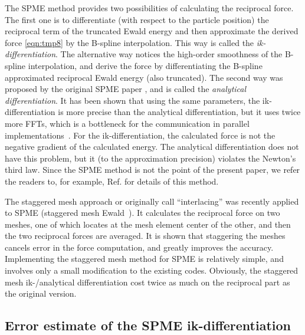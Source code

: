 \documentclass[journal=jacsat,manuscript=article]{achemso}
\newcommand{\redc}[1]{{\color{black} #1}}
\begin{document}
The SPME method provides two possibilities of calculating the
reciprocal force. The first one is to differentiate (with respect to
the particle position) the reciprocal term of the truncated Ewald
energy and then approximate the derived force \ref{eqn:tmp8} by the
B-spline interpolation. This way is called the
\emph{ik-differentiation}.
The alternative way notices the high-order
smoothness of the B-spline interpolation, and derive the force by
differentiating the B-spline approximated reciprocal Ewald energy
(also truncated). The second way was proposed by the original SPME paper
\cite{essmann1995spm}, and is called the \emph{analytical
  differentiation}.
It has been shown that using the same parameters,
the ik-differentiation is more precise than the analytical
differentiation, but it uses twice more FFTs, which is a bottleneck
for the communication in parallel
implementations~\cite{wang2010optimizing}.
For the ik-differentiation, the calculated force is not the negative
gradient of the calculated energy. The analytical differentiation
does not have this problem, but it (to the approximation precision)
violates the Newton's third law.
Since the SPME method is
not the point of the present paper, we refer the readers to, for
example, Ref. \cite{essmann1995spm, deserno1998mue1,
  wang2010optimizing} for details of this method.

The staggered mesh approach or originally call ``interlacing'' was
recently applied to SPME (staggered mesh Ewald~\cite{cerutti2009staggered}).
It calculates the
reciprocal force on two meshes,
one of which locates at the mesh element center
of the other, and then the two reciprocal forces are averaged.
It is shown that staggering the meshes
cancels error in the force computation, and greatly improves the
accuracy.
Implementing the staggered mesh method for SPME is
relatively simple, and involves only \redc{a small} modification to the
existing codes.
Obviously, the staggered mesh ik-/analytical differentiation
cost twice as much on the
reciprocal part as the original version.

\subsection{Error estimate of the SPME ik-differentiation}
\label{sec:error-ik}
\end{document}
